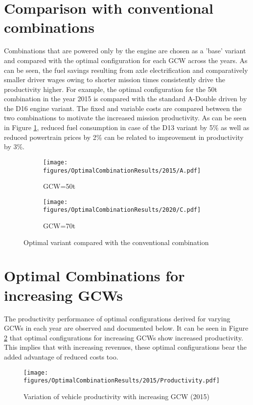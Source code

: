 \documentclass[ExampleMasters.tex]{subfiles}
\begin{document}
\section{Comparison with conventional combinations}
	Combinations that are powered only by the engine are chosen as a 'base' variant and compared with the optimal configuration for each GCW across the years. As can be seen, the fuel savings resulting from axle electrification and comparatively smaller driver wages owing to shorter mission times consistently drive the productivity higher. For example, the optimal configuration for the 50t combination in the year 2015 is compared with the standard A-Double driven by the D16 engine variant. The fixed and variable costs are compared between the two combinations to motivate the increased mission productivity. As can be seen in Figure \ref{2015AC0vsAC1}, reduced fuel consumption in case of the D13 variant by 5\% as well as reduced powertrain prices by 2\% can be related to improvement in productivity by 3\%.\\

	\begin{figure}[H]
		\begin{subfigure}{0.5\textwidth}
			\centering
			\texttt{[image: figures/OptimalCombinationResults/2015/A.pdf]}
			\caption{GCW=50t}
		\end{subfigure}
		\begin{subfigure}{.5\textwidth}
			\centering
			\texttt{[image: figures/OptimalCombinationResults/2020/C.pdf]}
			\caption{GCW=70t}
		\end{subfigure}
		\caption{Optimal variant compared with the conventional combination}
		\label{2015AC0vsAC1}
	\end{figure}

\section{Optimal Combinations for increasing GCWs}
	The productivity performance of optimal configurations derived for varying GCWs in each year are observed and documented below. It can be seen in Figure \ref{prodVaryGCW2015} that optimal configurations for increasing GCWs show increased productivity. This implies that with increasing revenues, these optimal configurations bear the added advantage of reduced costs too.\\

	\begin{figure}[H]
		\centering
		\texttt{[image: figures/OptimalCombinationResults/2015/Productivity.pdf]}
		\caption{Variation of vehicle productivity with increasing GCW (2015)}
		\label{prodVaryGCW2015}
	\end{figure}
\end{document}
